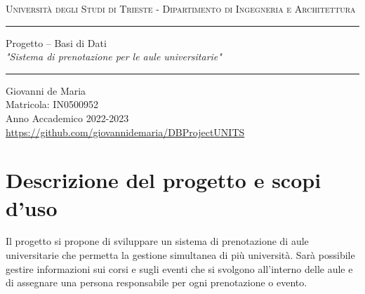 \documentclass[a4paper, 10pt, oneside]{article} %
\begin{document}
\pagestyle{fancy}
	\fancyhf{}
	\fancyhead[C]{}
	\renewcommand{\headrulewidth}{0.4pt}
	\fancyfoot[C]{\thepage}
	\renewcommand{\footrulewidth}{0.4pt}

	\thispagestyle{empty}	
{
		\centering 
	
	\vspace*{\baselineskip} %
	
	\textsc{Università degli Studi di Trieste - Dipartimento di Ingegneria e Architettura}
	\bigskip\bigskip
	
	\rule{\textwidth}{1.6pt}\vspace*{2pt} %
	
	\vspace{0.75\baselineskip} %
	
	{\LARGE Progetto -- Basi di Dati\\
 \textit{"Sistema di prenotazione per le aule universitarie"}} %
 
	
	\vspace{0.75\baselineskip} %
	
	\rule{\textwidth}{1.6pt}\vspace*{2pt} %

	\vspace{2\baselineskip} %
	
	Giovanni de Maria \\
	\medskip
	Matricola: IN0500952\\
	\bigskip
	Anno Accademico 2022-2023\\
    \bigskip
    \url{https://github.com/giovannidemaria/DBProjectUNITS}
	

	}

\tableofcontents
\newpage
\section{Descrizione del progetto e scopi d'uso}

Il progetto si propone di sviluppare un sistema di prenotazione di aule universitarie che permetta la gestione simultanea di più università. Sarà possibile gestire informazioni sui corsi e sugli eventi che si svolgono all'interno delle aule e di assegnare una persona responsabile per ogni prenotazione o evento.\\
\end{document}
